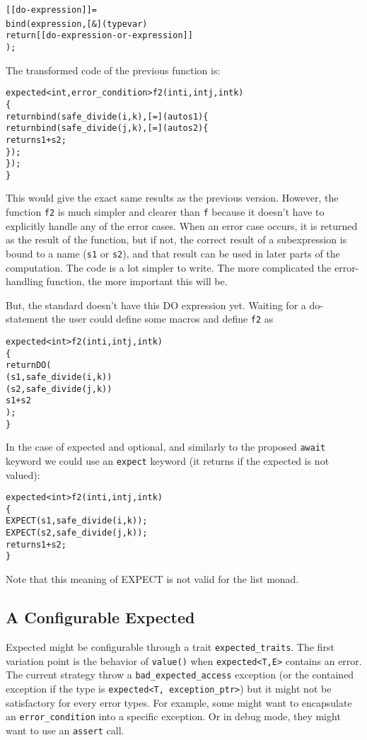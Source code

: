 \documentclass[a4paper,10pt]{article}
\newcommand{\cpp}[1]{\lstinline{#1}}
\begin{document}
\begin{alltt}
[[do-expression]] =
  bind(expression, [&](type var) {
    return [[do-expression-or-expression]]
  });
\end{alltt}
\noindent
The transformed code of the previous function is:

\begin{alltt}
expected<int, error_condition> f2(int i, int j, int k)
\{
  return bind(safe_divide(i, k) ,[=](auto s1) \{
    return bind(safe_divide(j, k),[=](auto s2) \{
      return s1 + s2;
    \});
  \}); 
\}
\end{alltt}

This would give the exact same results as the previous version. However, the function \cpp{f2} is much simpler and clearer than \cpp{f} because it doesn't have to explicitly handle any of the error cases. When an error case occurs, it is returned as the result of the function, but if not, the correct result of a subexpression is bound to a name (\cpp{s1} or \cpp{s2}), and that result can be used in later parts of the computation. The code is a lot simpler to write. The more complicated the error-handling function, the more important this will be.

But, the standard doesn't have this DO expression yet.
Waiting for a do-statement the user could define some macros and define \cpp{f2} as

\begin{alltt}
expected<int> f2(int i, int j, int k)
\{
    return DO (
         ( s1, safe_divide(i, k) )
         ( s2, safe_divide(j, k) )
         s1 + s2 
    );
\}
\end{alltt}

In the case of expected and optional, and similarly to the proposed \cpp{await} keyword we could use an \cpp{expect} keyword (it returns if the expected is not valued):

\begin{alltt}
expected<int> f2(int i, int j, int k)
\{
  EXPECT(s1, safe_divide(i, k));
  EXPECT(s2, safe_divide(j, k));
  return s1 + s2;
\}
\end{alltt}

Note that this meaning of EXPECT is not valid for the list monad. 

\subsection{A Configurable Expected}
\label{configurable-expected}

Expected might be configurable through a trait \cpp{expected_traits}. The first variation point is the behavior of \cpp{value()} when \cpp{expected<T,E>} contains an error. The current strategy throw a \cpp{bad_expected_access} exception (or the contained exception if the type is \cpp{expected<T, exception_ptr>}) but it might not be satisfactory for every error types. For example, some might want to encapsulate an \cpp{error_condition} into a specific exception. Or in debug mode, they might want to use an \cpp{assert} call.
\end{document}

